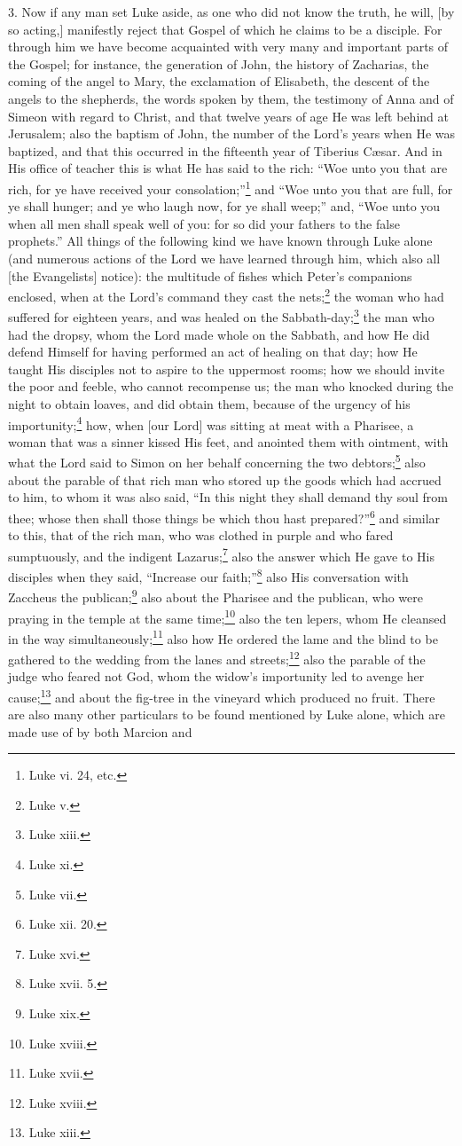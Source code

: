 3. Now if any man set Luke aside, as one who did not know the truth, he will, [by so acting,] manifestly reject that Gospel of which he claims to be a disciple. For through him we have become acquainted with very many and important parts of the Gospel; for instance, the generation of John, the history of Zacharias, the coming of the angel to Mary, the exclamation of Elisabeth, the descent of the angels to the shepherds, the words spoken by them, the testimony of Anna and of Simeon with regard to Christ, and that twelve years of age He was left behind at Jerusalem; also the baptism of John, the number of the Lord’s years when He was baptized, and that this occurred in the fifteenth year of Tiberius Cæsar. And in His office of teacher this is what He has said to the rich: “Woe unto you that are rich, for ye have received your consolation;”\footnote{Luke vi. 24, etc.} and “Woe unto you that are full, for ye shall hunger; and ye who laugh now, for ye shall weep;” and, “Woe unto you when all men shall speak well of you: for so did your fathers to the false prophets.” All things of the following kind we have known through Luke alone (and numerous actions of the Lord we have learned through him, which also all [the Evangelists] notice): the multitude of fishes which Peter’s companions enclosed, when at the Lord’s command they cast the nets;\footnote{Luke v.} the woman who had suffered for eighteen years, and was healed on the Sabbath-day;\footnote{Luke xiii.} the man who had the dropsy, whom the Lord made whole on the Sabbath, and how He did defend Himself for having performed an act of healing on that day; how He taught His disciples not to aspire to the uppermost rooms; how we should invite the poor and feeble, who cannot recompense us; the man who knocked during the night to obtain loaves, and did obtain them, because of the urgency of his importunity;\footnote{Luke xi.} how, when [our Lord] was sitting at meat with a Pharisee, a woman that was a sinner kissed His feet, and anointed them with ointment, with what the Lord said to Simon on her behalf concerning the two debtors;\footnote{Luke vii.} also about the parable of that rich man who stored up the goods which had accrued to him, to whom it was also said, “In this night they shall demand thy soul from thee; whose then shall those things be which thou hast prepared?”\footnote{Luke xii. 20.} and similar to this, that of the rich man, who was clothed in purple and who fared sumptuously, and the indigent Lazarus;\footnote{Luke xvi.} also the answer which He gave to His disciples when they said, “Increase our faith;”\footnote{Luke xvii. 5.} also His conversation with Zaccheus the publican;\footnote{Luke xix.} also about  the Pharisee and the publican, who were praying in the temple at the same time;\footnote{Luke xviii.} also the ten lepers, whom He cleansed in the way simultaneously;\footnote{Luke xvii.} also how He ordered the lame and the blind to be gathered to the wedding from the lanes and streets;\footnote{Luke xviii.} also the parable of the judge who feared not God, whom the widow’s importunity led to avenge her cause;\footnote{Luke xiii.} and about the fig-tree in the vineyard which produced no fruit. There are also many other particulars to be found mentioned by Luke alone, which are made use of by both Marcion and 